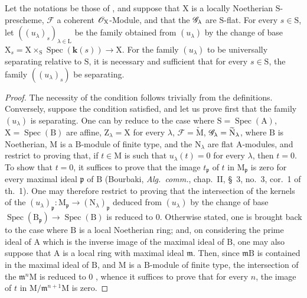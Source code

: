 \begin{theorem}[11.9.16]
\label{IV.11.9.16}
Let the notations be those of , and suppose that $\mathrm{X}$ is a locally Noetherian $\mathrm{S}$-prescheme, $\mathscr{F}$ a coherent $\mathscr{O}_\mathrm{X}$-Module, and that the $\mathscr{G}_\lambda$ are $\mathrm{S}$-flat.
For every $s\in\mathrm{S}$, let $((u_\lambda)_s)_{\lambda\in\mathrm{L}}$ be the family obtained from $(u_\lambda)$ by the change of base $\mathrm{X}_s=\mathrm{X}\times_\mathrm{S}\operatorname{Spec}(\boldsymbol{k}(s))\to\mathrm{X}$.
For the family $(u_\lambda)$ to be universally separating relative to $\mathrm{S}$, it is necessary and sufficient that for every $s\in\mathrm{S}$, the family $((u_\lambda)_s)$ be separating.
\end{theorem}

\begin{proof}
The necessity of the condition follows trivially from the definitions.
Conversely, suppose the condition satisfied, and let us prove first that the family $(u_\lambda)$ is separating.
One can by  reduce to the case where $\mathrm{S}=\operatorname{Spec}(\mathrm{A})$, $\mathrm{X}=\operatorname{Spec}(\mathrm{B})$ are affine, $\mathrm{Z}_\lambda=\mathrm{X}$ for every $\lambda$, $\mathscr{F}=\widetilde{\mathrm{M}}$, $\mathscr{G}_\lambda=\widetilde{\mathrm{N}}_\lambda$, where $\mathrm{B}$ is Noetherian, $\mathrm{M}$ is a $\mathrm{B}$-module of finite type, and the $\mathrm{N}_\lambda$ are flat $\mathrm{A}$-modules, and restrict to proving that, if $t\in\mathrm{M}$ is such that $u_\lambda(t)=0$ for every $\lambda$, then $t=0$.
To show that $t=0$, it suffices to prove that the image $t_\mathfrak{p}$ of $t$ in $\mathrm{M}_\mathfrak{p}$ is zero for every maximal ideal $\mathfrak{p}$ of $\mathrm{B}$ (Bourbaki, \emph{Alg.\ comm.}, chap.~II, \S~3, no.~3, cor.~1 of th.~1).
One may therefore restrict to proving that the intersection
of the kernels of the $(u_\lambda)_\mathfrak{p}:\mathrm{M}_\mathfrak{p}\to(\mathrm{N}_\lambda)_\mathfrak{p}$ deduced from $(u_\lambda)$ by the change of base $\operatorname{Spec}(\mathrm{B}_\mathfrak{p})\to\operatorname{Spec}(\mathrm{B})$ is reduced to $0$.
Otherwise stated, one is brought back to the case where $\mathrm{B}$ is a local Noetherian ring; and, on considering the prime ideal of $\mathrm{A}$ which is the inverse image of the maximal ideal of $\mathrm{B}$, one may also suppose that $\mathrm{A}$ is a local ring with maximal ideal $\mathfrak{m}$.
Then, since $\mathfrak{m}\mathrm{B}$ is contained in the maximal ideal of $\mathrm{B}$, and $\mathrm{M}$ is a $\mathrm{B}$-module of finite type, the intersection of the $\mathfrak{m}^{n}\mathrm{M}$ is reduced to $0$ , whence it suffices to prove that for every $n$, the image of $t$ in $\mathrm{M}/\mathfrak{m}^{n+1}\mathrm{M}$ is zero.

\end{proof}

